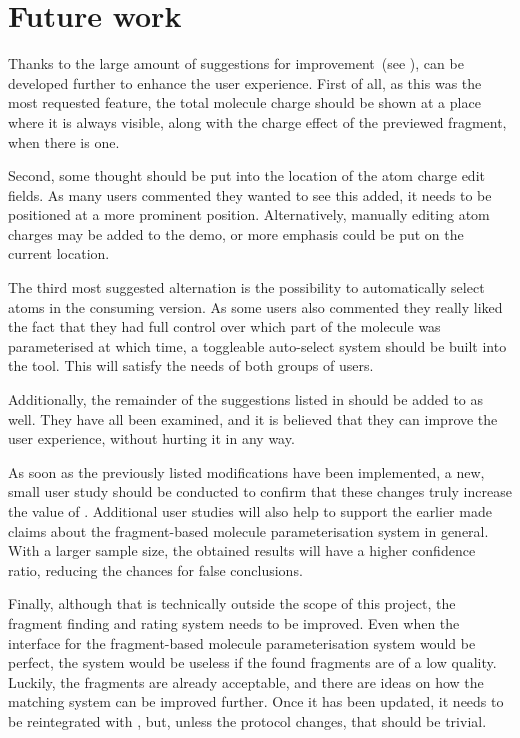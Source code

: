 \section{Future work}
Thanks to the large amount of suggestions for improvement~(see ), \oframp{} can be developed further to enhance the user experience. First of all, as this was the most requested feature, the total molecule charge should be shown at a place where it is always visible, along with the charge effect of the previewed fragment, when there is one.

Second, some thought should be put into the location of the atom charge edit fields. As many users commented they wanted to see this added, it needs to be positioned at a more prominent position. Alternatively, manually editing atom charges may be added to the demo, or more emphasis could be put on the current location.

The third most suggested alternation is the possibility to automatically select atoms in the consuming version. As some users also commented they really liked the fact that they had full control over which part of the molecule was parameterised at which time, a toggleable auto-select system should be built into the tool. This will satisfy the needs of both groups of users.

Additionally, the remainder of the suggestions listed in  should be added to \oframp{} as well. They have all been examined, and it is believed that they can improve the user experience, without hurting it in any way.

As soon as the previously listed modifications have been implemented, a new, small user study should be conducted to confirm that these changes truly increase the value of \oframp. Additional user studies will also help to support the earlier made claims about the fragment-based molecule parameterisation system in general. With a larger sample size, the obtained results will have a higher confidence ratio, reducing the chances for false conclusions.

Finally, although that is technically outside the scope of this project, the fragment finding and rating system needs to be improved. Even when the interface for the fragment-based molecule parameterisation system would be perfect, the system would be useless if the found fragments are of a low quality. Luckily, the fragments are already acceptable, and there are ideas on how the matching system can be improved further. Once it has been updated, it needs to be reintegrated with \oframp, but, unless the protocol changes, that should be trivial.
